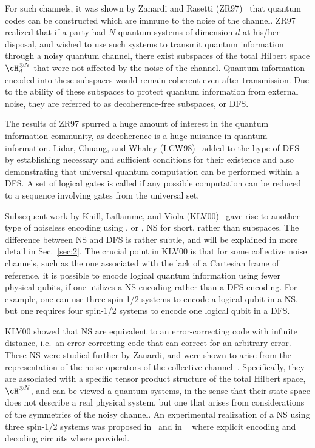 For such channels, it was shown by Zanardi and Rasetti (ZR97)~\cite{ZR97} that quantum codes can be constructed which are immune to the noise of the channel.  ZR97 realized that if a party had $N$ quantum systems of dimension $d$ at his/her disposal, and wished to use such systems to transmit quantum information through a noisy quantum channel, there exist subspaces of the total Hilbert space $\cH_d^{\otimes N}$ that were not affected by the noise of the channel. Quantum information encoded into these subspaces would remain coherent even after transmission.  Due to the ability of these subspaces to protect quantum information from external noise, they are referred to as decoherence-free subspaces, or DFS.  

The results of ZR97 spurred a huge amount of interest in the quantum information community, as decoherence is a huge nuisance in quantum information.  Lidar, Chuang, and Whaley (LCW98)~\cite{LCW98} added to the hype of DFS by establishing necessary and sufficient conditions for their existence and also demonstrating that universal quantum computation can be performed within a DFS.  A set of logical gates is called  if any possible computation can be reduced to a sequence involving gates from the universal set. 

Subsequent work by Knill, Laflamme, and Viola (KLV00)~\cite{KLV00} gave rise to another type of noiseless encoding using , or , NS for short, rather than subspaces. The difference between NS and DFS is rather subtle, and will be explained in more detail in Sec.~\ref{sec:2}.  The crucial point in KLV00 is that for some collective noise channels, such as the one associated with the lack of a Cartesian frame of reference, it is possible to encode logical quantum information using fewer physical qubits, if one utilizes a NS encoding rather than a DFS encoding. For example, one can use three spin-1/2 systems to encode a logical qubit in a NS, but one requires four spin-1/2 systems to encode one logical qubit in a DFS.  

KLV00 showed that NS are equivalent to an error-correcting code with infinite distance, i.e.~an error correcting code that can correct for an arbitrary error.  These NS were studied further by Zanardi, and were shown to arise from the representation of the noise operators of the collective channel~\cite{Z00,Z01}.  Specifically, they are associated with a specific tensor product structure of the total Hilbert space, $\cH^{\otimes N}$, and can be viewed a  quantum systems, in the sense that their state space does not describe a real physical system, but one that arises from considerations of the symmetries of the noisy channel.  An experimental realization of a NS using three spin-1/2 systems was proposed in~\cite{VFPKLC01} and in ~\cite{YG01} where explicit encoding and decoding circuits where provided.

